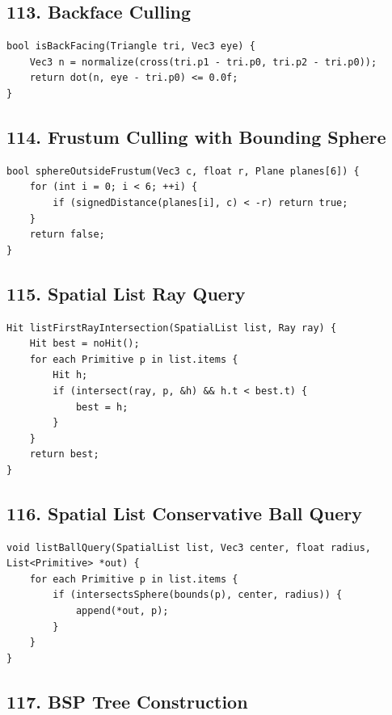 \documentclass[10pt,letterpaper]{article}
\begin{document}
\subsection{113. Backface Culling}

\begin{verbatim}
bool isBackFacing(Triangle tri, Vec3 eye) {
    Vec3 n = normalize(cross(tri.p1 - tri.p0, tri.p2 - tri.p0));
    return dot(n, eye - tri.p0) <= 0.0f;
}
\end{verbatim}

\subsection{114. Frustum Culling with Bounding Sphere}

\begin{verbatim}
bool sphereOutsideFrustum(Vec3 c, float r, Plane planes[6]) {
    for (int i = 0; i < 6; ++i) {
        if (signedDistance(planes[i], c) < -r) return true;
    }
    return false;
}
\end{verbatim}

\subsection{115. Spatial List Ray Query}

\begin{verbatim}
Hit listFirstRayIntersection(SpatialList list, Ray ray) {
    Hit best = noHit();
    for each Primitive p in list.items {
        Hit h;
        if (intersect(ray, p, &h) && h.t < best.t) {
            best = h;
        }
    }
    return best;
}
\end{verbatim}

\subsection{116. Spatial List Conservative Ball Query}

\begin{verbatim}
void listBallQuery(SpatialList list, Vec3 center, float radius, List<Primitive> *out) {
    for each Primitive p in list.items {
        if (intersectsSphere(bounds(p), center, radius)) {
            append(*out, p);
        }
    }
}
\end{verbatim}

\subsection{117. BSP Tree Construction}
\end{document}
